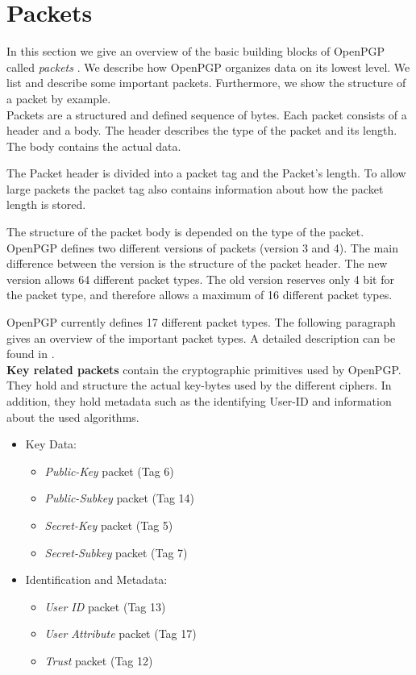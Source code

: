 \section{Packets}
\label{section:messageformat:packets}

In this section we give an overview of the basic building blocks of OpenPGP called \textit{packets} \cite[section 5]{RFC4880}. We describe how OpenPGP organizes data on its lowest level. We list and describe some important packets. Furthermore, we show the structure of a packet by example.  \\


Packets are a structured and defined sequence of bytes.  Each packet consists of a header and a body. The header describes the type of the packet and its length. The body contains the actual data.

The Packet header is divided into a packet tag and the Packet's length. To allow large packets the packet tag also contains information about how the packet length is stored. 

The structure of the packet body is depended on the type of the packet. \\


OpenPGP defines two different versions of packets (version 3 and 4). The main difference between the version is the structure of the packet header. The new version allows 64 different packet types. The old version reserves only 4 bit for the packet type, and therefore allows a maximum of 16 different packet types.

OpenPGP currently defines 17 different packet types. The following paragraph gives an overview of the important packet types. A detailed description can be found in \cite[section 5]{RFC4880}. \\ 


\textbf{Key related packets} contain the cryptographic primitives used by OpenPGP. They hold and structure the actual key-bytes used by the different ciphers. In addition, they hold metadata such as the identifying User-ID and information about the used algorithms.

\begin{itemize}
	\item Key Data:
	\begin{itemize}
		\item \textit{Public-Key} packet (Tag 6)
		\item \textit{Public-Subkey} packet (Tag 14)
		\item \textit{Secret-Key} packet (Tag 5)
		\item \textit{Secret-Subkey} packet (Tag 7)
	\end{itemize}
	\item Identification and Metadata:
	\begin{itemize}
		\item \textit{User ID} packet (Tag 13)
		\item \textit{User Attribute} packet (Tag 17)
		\item \textit{Trust} packet (Tag 12)
	\end{itemize}
\end{itemize}

